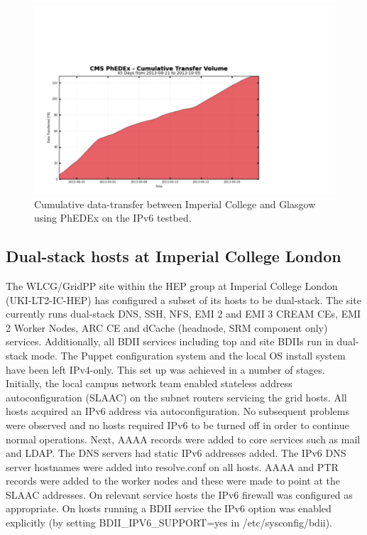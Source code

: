 \begin{figure}[htp]
\centering
\includegraphics{phedex-transfer-volume}
\caption{Cumulative data-transfer between Imperial College and Glasgow using PhEDEx on the IPv6 testbed.}\label{fig:phedex-transfer-volume}
\end{figure}

\subsection{Dual-stack hosts at Imperial College London}
The WLCG/GridPP site within the HEP group at Imperial College London (UKI-LT2-IC-HEP) has configured a subset of its hosts to be dual-stack. 
The site currently runs dual-stack DNS, SSH, NFS, EMI 2 and EMI 3 CREAM CEs, EMI 2 Worker Nodes, 
ARC CE and dCache (headnode, SRM component only) services.
Additionally, all BDII services including top and site BDIIs run in dual-stack mode. The Puppet configuration system and the local OS install system have been left IPv4-only.
This set up was achieved in a number of stages. Initially, the local campus network team enabled 
stateless address autoconfiguration (SLAAC) on the subnet routers servicing the grid hosts. All hosts acquired an IPv6 address via autoconfiguration. 
No subsequent problems were observed and no hosts required IPv6 to be turned off in order to continue normal operations. 
Next, AAAA records were added to core services such as mail and LDAP. The DNS servers had static IPv6 addresses added. 
The IPv6 DNS server hostnames were added into resolve.conf on all hosts. AAAA and PTR records were added to the worker nodes and these were made to point at the SLAAC addresses. 
On relevant service hosts the IPv6 firewall was configured as appropriate. On hosts running a BDII service the IPv6 option was enabled explicitly 
(by setting BDII\_IPV6\_SUPPORT=yes in /etc/sysconfig/bdii).
